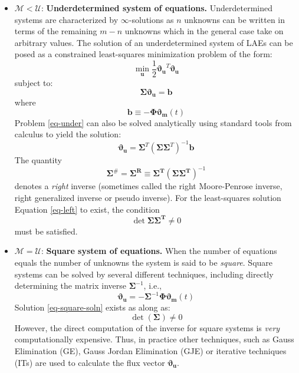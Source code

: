 \documentclass[11pt]{article}
\theoremstyle{definition}
\begin{document}
\begin{itemize}
\item{$\mathcal{M}<\mathcal{U}$: \textbf{Underdetermined system of equations.}
Underdetermined systems are characterized by $\infty$-solutions as $n$ unknowns can be written in terms of the remaining $m-n$
unknowns which in the general case take on arbitrary values. The solution of an underdetermined system of LAEs can be posed
as a constrained least-squares minimization problem of the form:
\begin{equation}\label{eq-under}
\min_{\mathbf{u}}\frac{1}{2}\mathbf{\vartheta_{u}}^{T}\mathbf{\vartheta_{u}}
\end{equation}subject to:
\begin{equation}
\mathbf{\Sigma\vartheta_{u}}=\mathbf{b}
\end{equation}where
\begin{equation}
\mathbf{b}\equiv-\mathbf{\Phi\vartheta_{m}}\left(t\right)
\end{equation}
Problem \eqref{eq-under} can also be solved analytically using standard tools from calculus to yield the solution:
\begin{equation}
\mathbf{\vartheta_{u}}=\mathbf{\Sigma}^{T}\left(\mathbf{\Sigma\Sigma}^{T}\right)^{-1}\mathbf{b}
\end{equation}
The quantity
\begin{equation}\label{eq-left}
\mathbf{\Sigma}^{\#} = \mathbf{\Sigma^{R}}\equiv\mathbf{\Sigma^{T}}\left(\mathbf{\Sigma\Sigma^{T}}\right)^{-1}
\end{equation}denotes a \emph{right} inverse (sometimes called the right Moore-Penrose inverse, right generalized inverse or pseudo inverse).
For the least-squares solution Equation
\eqref{eq-left} to exist, the condition
\begin{equation}
\det\mathbf{\Sigma\Sigma^{T}}\neq{0}
\end{equation}must be satisfied.}

\item{$\mathcal{M}=\mathcal{U}$: \textbf{Square system of equations.}
When the number of equations equals the number of unknowns the system is said to be \emph{square}. Square systems can be
solved by several different techniques, including directly determining the matrix inverse $\mathbf{\Sigma}^{-1}$, i.e.,
\begin{equation}\label{eq-square-soln}
\mathbf{\vartheta_{u}}=-\mathbf{\Sigma}^{-1}\mathbf{\Phi\vartheta_{m}}\left(t\right)
\end{equation}Solution \eqref{eq-square-soln} exists as along as:
\begin{equation}
\det\left(\mathbf{\Sigma}\right)\neq{0}
\end{equation}
However, the direct computation of the inverse for square systems is \emph{very} computationally expensive. Thus, in practice
other techniques, such as Gauss Elimination (GE), Gauss Jordan Elimination (GJE) or iterative techniques (ITs) are used to calculate the flux
vector $\mathbf{\vartheta_{u}}$.}
\end{itemize}
\end{document}
